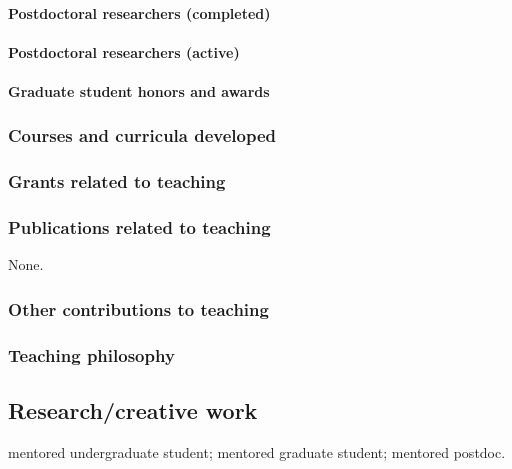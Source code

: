 

\paragraph{Postdoctoral researchers (completed)}



\paragraph{Postdoctoral researchers (active)}



\paragraph{Graduate student honors and awards}


\subsubsection{Courses and curricula developed}


\subsubsection{Grants related to teaching}


\subsubsection{Publications related to teaching}
None.

\subsubsection{Other contributions to teaching}


\subsubsection{Teaching philosophy}


\subsection{Research/creative work}
\ugsymbol{}mentored undergraduate student;
\phdsymbol{}mentored graduate student;
\postdocsymbol{}mentored postdoc.

